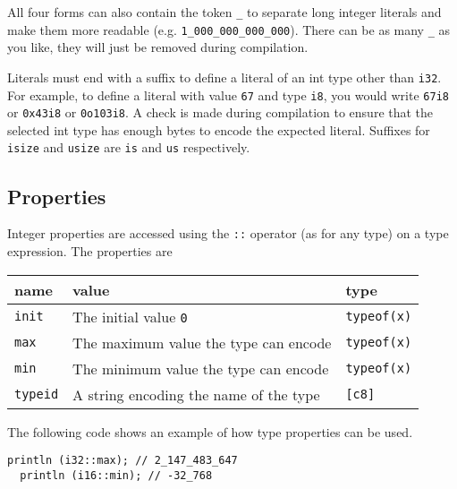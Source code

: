 All four forms can also contain the token \texttt{\_} to separate long integer
literals and make them more readable (e.g. \texttt{1\_000\_000\_000\_000}).
There can be as many \texttt{\_} as you like, they will just be removed during
compilation.

Literals must end with a suffix to define a literal of an int type other than
\texttt{i32}. For example, to define a literal with value \texttt{67} and type
\texttt{i8}, you would write \texttt{67i8} or \texttt{0x43i8} or
\texttt{0o103i8}. A check is made during compilation to ensure that the selected
int type has enough bytes to encode the expected literal. Suffixes for
\texttt{isize} and \texttt{usize} are \texttt{is} and \texttt{us} respectively.

\subsection{Properties}
\label{sec:orgc02cb40}

Integer properties are accessed using the \texttt{::} operator (as for any type)
on a type expression. The properties are

\begin{center}
  \vspace{-3pt}
  \begin{adjustbox}{max width=\linewidth}
    \begin{tabular}{|l|ll|}
      \hline
      name & value & type\\[0pt]
      \hline
      \hline
      \texttt{init} & The initial value \texttt{0} & \texttt{typeof(x)}\\[0pt]
      \texttt{max} & The maximum value the type can encode & \texttt{typeof(x)}\\[0pt]
      \texttt{min} & The minimum value the type can encode & \texttt{typeof(x)}\\[0pt]
      \hline
      \texttt{typeid} & A string encoding the name of the type & \texttt{[c8]}\\[0pt]
      \hline
    \end{tabular}
  \end{adjustbox}
\end{center}

\smallskip

The following code shows an example of how type properties can be used.
\smallskip

\begin{lstlisting}[style=coloredverbatim]
  println (i32::max); // 2_147_483_647
  println (i16::min); // -32_768
\end{lstlisting}

